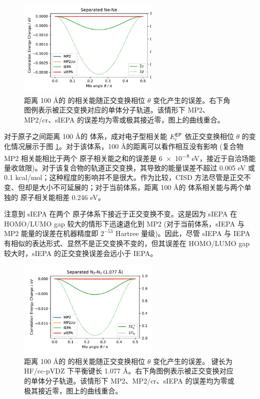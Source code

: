 \begin{figure}[!ht]
  \centering
  \includegraphics[width=0.6\textwidth]{assets/invar-sep-Ne.pdf}
  \caption[ 对称性简并轨道正交变换误差]{距离 100 \AA 的  的相关能随正交变换相位 $\theta$ 变化产生的误差。右下角图例表示被正交变换对应的单体分子轨道。该情形下 MP2、MP2/cr、sIEPA 的误差均为零或极其接近零，图上的曲线重合。}
  \label{fig.2.invar-sep-Ne}
\end{figure}

对于原子之间距离 100 \AA 的  体系，成对电子型相关能 $E_\mathrm{c}^{\textsf{EP}}$ 依正交变换相位 $\theta$ 的变化情况展示于图 \ref{fig.2.invar-sep-Ne}。对于该体系，100 \AA 的距离可以看作相互没有影响 (复合物 MP2 相关能相比于两个  原子相关能之和的误差是 \num{6e-8} eV，接近于自洽场能量收敛限)。对于该复合物的轨道正交变换，其导致的能量误差不超过 0.005 eV 或 0.1 kcal/mol；这种程度的影响并不是很大。作为比较，CISD 方法尽管是正交不变、但却是大小不可延展的；对于当前体系，距离 100 \AA 的  体系相关能与两个单独的  原子相关能相差 0.246 eV。

注意到 sIEPA 在两个  原子体系下接近于正交变换不变。这是因为 sIEPA 在 HOMO/LUMO gap 较大的情形下迅速退化到 MP2 (对于当前体系，sIEPA 与 MP2 能量的误差在机器精度即 $2^{-53}$ Hartree 量级)。因此，尽管 sIEPA 与 IEPA 有相似的表达形式、显然不是正交变换不变的，但其误差在 HOMO/LUMO gap 较大时，sIEPA 的正交变换误差会远小于 IEPA。

\begin{figure}[!ht]
  \centering
  \includegraphics[width=0.6\textwidth]{assets/invar-sep-N2-1.pdf}
  \caption[ 对称性简并轨道正交变换误差 (键长 1.077 \AA)]{距离 100 \AA 的  的相关能随正交变换相位 $\theta$ 变化产生的误差。 键长为 HF/cc-pVDZ 下平衡键长 1.077 \AA。右下角图例表示被正交变换对应的单体分子轨道。该情形下 MP2、MP2/cr、sIEPA 的误差均为零或极其接近零，图上的曲线重合。}
  \label{fig.2.invar-sep-N2-1}
\end{figure}

